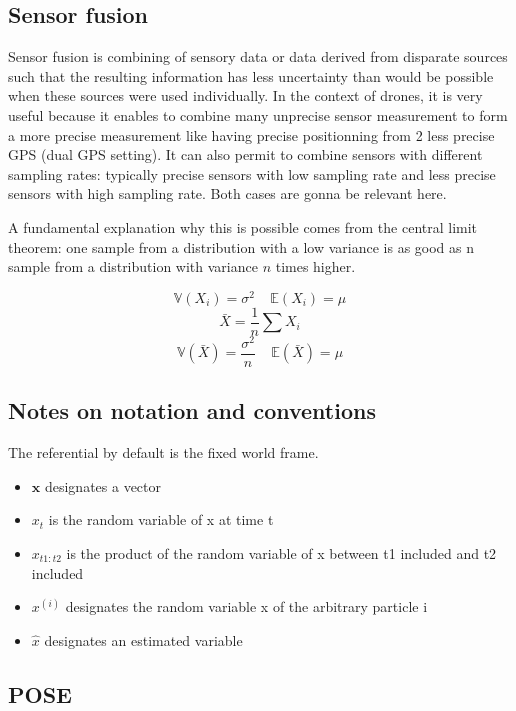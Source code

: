 \documentclass[]{article}
\providecommand{\tightlist}{%
  \setlength{\itemsep}{0pt}\setlength{\parskip}{0pt}}
\begin{document}
\subsection{Sensor fusion}\label{sensor-fusion}

Sensor fusion is combining of sensory data or data derived from
disparate sources such that the resulting information has less
uncertainty than would be possible when these sources were used
individually. In the context of drones, it is very useful because it
enables to combine many unprecise sensor measurement to form a more
precise measurement like having precise positionning from 2 less precise
GPS (dual GPS setting). It can also permit to combine sensors with
different sampling rates: typically precise sensors with low sampling
rate and less precise sensors with high sampling rate. Both cases are
gonna be relevant here.

A fundamental explanation why this is possible comes from the central
limit theorem: one sample from a distribution with a low variance is as
good as n sample from a distribution with variance \(n\) times higher.

\[\mathbb{V}(X_i)=\sigma^2 ~~~~~ \mathbb{E}(X_i) = \mu\]
\[\bar{X} = \frac{1}{n}\sum X_i\]
\[\mathbb{V}(\bar{X}) = \frac{\sigma^2}{n}  ~~~~~ \mathbb{E}(\bar{X}) = \mu\]

\subsection{Notes on notation and
conventions}\label{notes-on-notation-and-conventions}

The referential by default is the fixed world frame.

\begin{itemize}
\tightlist
\item
  \(\mathbf{x}\) designates a vector
\item
  \(x_t\) is the random variable of x at time t
\item
  \(x_{t1:t2}\) is the product of the random variable of x between t1
  included and t2 included
\item
  \(x^{(i)}\) designates the random variable x of the arbitrary particle
  i
\item
  \(\hat{x}\) designates an estimated variable
\end{itemize}

\subsection{POSE}\label{pose}
\end{document}
